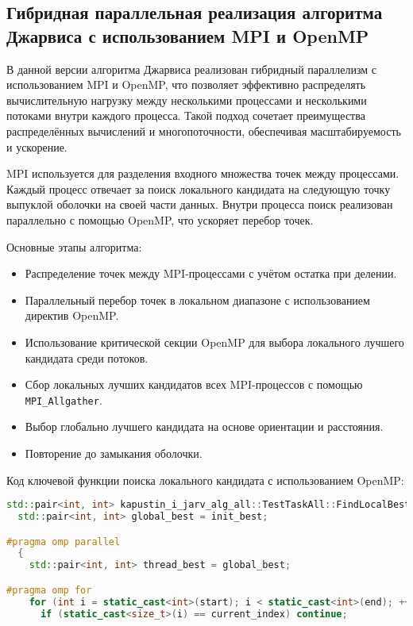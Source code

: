 \documentclass[a4paper,12pt]{article}
\begin{document}
\begin{itemize}
\newpage
\section{Гибридная параллельная реализация алгоритма Джарвиса с использованием MPI и OpenMP}

В данной версии алгоритма Джарвиса реализован гибридный параллелизм с использованием MPI и OpenMP, что позволяет эффективно распределять вычислительную нагрузку между несколькими процессами и несколькими потоками внутри каждого процесса. Такой подход сочетает преимущества распределённых вычислений и многопоточности, обеспечивая масштабируемость и ускорение.

MPI используется для разделения входного множества точек между процессами. Каждый процесс отвечает за поиск локального кандидата на следующую точку выпуклой оболочки на своей части данных. Внутри процесса поиск реализован параллельно с помощью OpenMP, что ускоряет перебор точек.

Основные этапы алгоритма:
\begin{itemize}
  \item Распределение точек между MPI-процессами с учётом остатка при делении.
  \item Параллельный перебор точек в локальном диапазоне с использованием директив OpenMP.
  \item Использование критической секции OpenMP для выбора локального лучшего кандидата среди потоков.
  \item Сбор локальных лучших кандидатов всех MPI-процессов с помощью \texttt{MPI\_Allgather}.
  \item Выбор глобально лучшего кандидата на основе ориентации и расстояния.
  \item Повторение до замыкания оболочки.
\end{itemize}
\newpage
Код ключевой функции поиска локального кандидата с использованием OpenMP:

\begin{lstlisting}[language=C++, caption={Параллельный локальный поиск лучшей точки с OpenMP}]
std::pair<int, int> kapustin_i_jarv_alg_all::TestTaskAll::FindLocalBestOMP(size_t start, size_t end, size_t current_index, const std::pair<int, int>& init_best) {                             
  std::pair<int, int> global_best = init_best;

#pragma omp parallel
  {
    std::pair<int, int> thread_best = global_best;

#pragma omp for
    for (int i = static_cast<int>(start); i < static_cast<int>(end); ++i) {
      if (static_cast<size_t>(i) == current_index) continue;


\end{lstlisting}
\end{itemize}
\end{document}

